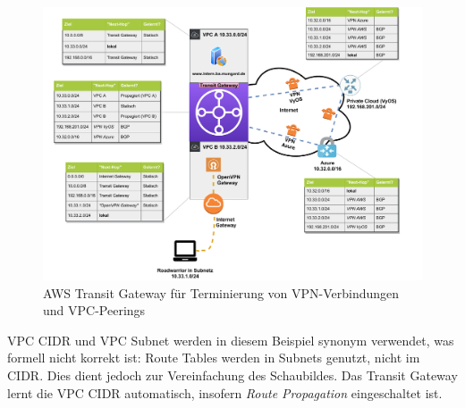 \begin{figure}[h]
  \centering
  \includegraphics[scale=0.75]{Figures/Use-Case-2_AWS_TGW_Route-Tables.pdf}
  \caption{AWS Transit Gateway für Terminierung von VPN-Verbindungen und VPC-Peerings}
  \label{grafik:aws_tgw_route_tables}
\end{figure}\FloatBarrier
VPC \gls{CIDR} und \gls{VPC} Subnet werden in diesem Beispiel synonym verwendet, was formell nicht korrekt ist: Route Tables werden in Subnets genutzt, nicht im \gls{CIDR}. Dies dient jedoch zur Vereinfachung des Schaubildes. Das Transit Gateway lernt die \gls{VPC} \gls{CIDR} automatisch, insofern \textit{Route Propagation} eingeschaltet ist.
\newpage
